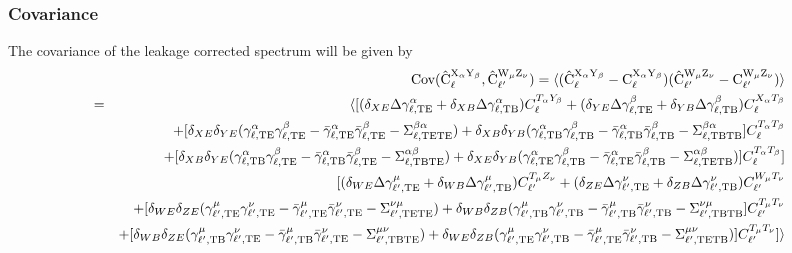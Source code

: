 \documentclass[a4paper, 11pt]{article}
\def\ba{\begin{eqnarray}}
\def\ea{\end{eqnarray}}
\begin{document}
\subsubsection{Covariance}

The covariance of the leakage corrected spectrum will be given by
\ba
&&\rm Cov( \hat{C}^{X_{\alpha} Y_{\beta}}_{\ell} , \hat{C}^{W_{\mu} Z_{\nu}}_{\ell'} ) = \langle ( \hat{C}^{X_{\alpha} Y_{\beta}}_{\ell}  - C^{X_{\alpha} Y_{\beta}}_{\ell} )( \hat{C}^{W_{\mu} Z_{\nu}}_{\ell'}  - C^{W_{\mu} Z_{\nu}}_{\ell'} ) \rangle  \\
&=&  \langle [(\delta_{XE} \Delta \gamma^{\alpha}_{\ell, \rm TE}  + \delta_{XB}\Delta \gamma^{\alpha}_{\ell, \rm TB}) C^{T_{\alpha} Y_{\beta}}_{\ell} +  (\delta_{YE}\Delta \gamma^{\beta}_{\ell, \rm TE}  + \delta_{YB}\Delta \gamma^{\beta}_{\ell, \rm TB})C^{X_{\alpha} T_{\beta}}_{\ell}  \nonumber \\
&& +  [\delta_{XE} \delta_{YE} (\gamma^{\alpha}_{\ell, \rm TE}  \gamma^{\beta}_{\ell, \rm TE} -  \bar{\gamma}^{\alpha}_{\ell, \rm TE}  \bar{\gamma}^{\beta}_{\ell, \rm TE} - \Sigma^{\beta \alpha}_{\ell, \rm  TE TE} ) +  \delta_{XB} \delta_{YB}(\gamma^{\alpha}_{\ell, \rm TB} \gamma^{\beta}_{\ell, \rm TB} - \bar{\gamma}^{\alpha}_{\ell, \rm TB} \bar{\gamma}^{\beta}_{\ell, \rm TB} -  \Sigma^{\beta \alpha}_{\ell, \rm  TB TB} ]C^{T_{\alpha} T_{\beta}}_{\ell}  \nonumber \\
&& + [\delta_{XB}\delta_{YE}(\gamma^{\alpha}_{\ell, \rm TB} \gamma^{\beta}_{\ell, \rm TE} - \bar{\gamma}^{\alpha}_{\ell, \rm TB} \bar{\gamma}^{\beta}_{\ell, \rm TE} - \Sigma^{ \alpha \beta}_{\ell, \rm  TB TE})  + \delta_{XE}\delta_{YB}(\gamma^{\alpha}_{\ell, \rm TE}  \gamma^{\beta}_{\ell, \rm TB} - \bar{\gamma}^{\alpha}_{\ell, \rm TE}  \bar{\gamma}^{\beta}_{\ell, \rm TB} - \Sigma^{ \alpha \beta}_{\ell, \rm  TE TB})  ]C^{T_{\alpha} T_{\beta}}_{\ell}]   \nonumber \\
 &&[(\delta_{WE} \Delta \gamma^{\mu}_{\ell', \rm TE}  + \delta_{WB}\Delta \gamma^{\mu}_{\ell', \rm TB}) C^{T_{\mu} Z_{\nu}}_{\ell'} +  (\delta_{ZE}\Delta \gamma^{\nu}_{\ell', \rm TE}  + \delta_{ZB}\Delta \gamma^{\nu}_{\ell', \rm TB})C^{W_{\mu} T_{\nu}}_{\ell'}  \nonumber \\
&& +  [\delta_{WE} \delta_{ZE} (\gamma^{\mu}_{\ell', \rm TE}  \gamma^{\nu}_{\ell', \rm TE} -  \bar{\gamma}^{\mu}_{\ell', \rm TE}  \bar{\gamma}^{\nu}_{\ell', \rm TE} - \Sigma^{\nu \mu}_{\ell', \rm  TE TE} ) +  \delta_{WB} \delta_{ZB}(\gamma^{\mu}_{\ell', \rm TB} \gamma^{\nu}_{\ell', \rm TB} - \bar{\gamma}^{\mu}_{\ell', \rm TB} \bar{\gamma}^{\nu}_{\ell', \rm TB} -  \Sigma^{\nu \mu}_{\ell', \rm  TB TB} ]C^{T_{\mu} T_{\nu}}_{\ell'}  \nonumber \\
&& + [\delta_{WB}\delta_{ZE}(\gamma^{\mu}_{\ell', \rm TB} \gamma^{\nu}_{\ell', \rm TE} - \bar{\gamma}^{\mu}_{\ell', \rm TB} \bar{\gamma}^{\nu}_{\ell', \rm TE} - \Sigma^{ \mu \nu}_{\ell', \rm  TB TE})  + \delta_{WE}\delta_{ZB}(\gamma^{\mu}_{\ell', \rm TE}  \gamma^{\nu}_{\ell', \rm TB} - \bar{\gamma}^{\mu}_{\ell', \rm TE}  \bar{\gamma}^{\nu}_{\ell', \rm TB} - \Sigma^{ \mu \nu}_{\ell', \rm  TE TB})  ]C^{T_{\mu} T_{\nu}}_{\ell'}]  \rangle  \nonumber \\
\ea
\end{document}
